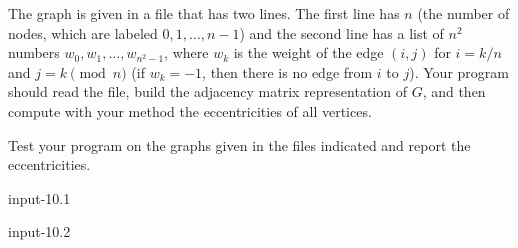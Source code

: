\documentclass[11pt]{article}
\begin{document}
The graph is given in a file that has two lines. The first line has $n$ (the number of nodes, which are  labeled $0,1, \ldots, n-1$) and the second line has a list of $n^2$ numbers $w_0, w_1, \ldots, w_{n^2 -1}$, where $w_k$ is the weight of the edge $(i,j)$ for $i=k/n$ and $j = k \pmod{n}$ (if $w_k = -1$, then there is no edge from $i$ to $j$).  Your program should read the file, build the adjacency matrix representation of $G$, and then compute with your method the eccentricities of all vertices. 

Test your program on the graphs given in the files indicated  and report the eccentricities.

input-10.1

input-10.2




 
\end{document}
